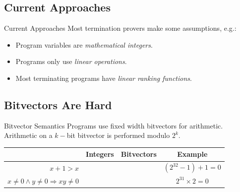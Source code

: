\documentclass[xcolor=pdftex,t,11pt]{beamer}
\newcommand{\xmark}{\ding{55}}
\newcommand{\red}[1]{\textcolor{red}{#1}}
\newcommand{\green}[1]{\textcolor{ta3chameleon}{#1}}
\begin{document}
\subsection{Current Approaches}

\begin{frame}{Current Approaches}
 Most termination provers make some assumptions, e.g.:
 
 \vspace{1em}
 
 \begin{itemize}
 \item Program variables are \emph{mathematical integers}.
 \item Programs only use \emph{linear operations}.
 \item Most terminating programs have \emph{linear ranking functions}.
 \end{itemize}
\end{frame}


\subsection{Bitvectors Are Hard}

\begin{frame}{Bitvector Semantics}
 Programs use fixed width bitvectors for arithmetic.  Arithmetic on a $k-$bit bitvector is performed modulo $2^k$.
 
 \vspace{1em}

 \begin{tabular}{r|ccc}
  & Integers & Bitvectors & Example \\
  \hline
  $x + 1 > x$ & \green{\checkmark} & \red{\xmark} & $(2^{32} - 1) + 1 = 0$ \\
  $x \neq 0 \wedge y \neq 0 \Rightarrow xy \neq 0$ & \green{\checkmark} & \red{\xmark} & $2^{31} \times 2 = 0$ \\
 \end{tabular}

\end{frame}
\end{document}
